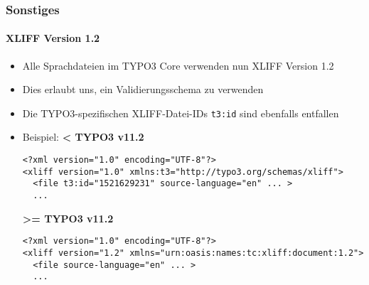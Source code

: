 %

\begin{frame}[fragile]
	\frametitle{Sonstiges}
	\framesubtitle{XLIFF Version 1.2}


	\begin{itemize}
		\item Alle Sprachdateien im TYPO3 Core verwenden nun XLIFF Version 1.2
		\item Dies erlaubt uns, ein Validierungsschema zu verwenden
		\item Die TYPO3-spezifischen XLIFF-Datei-IDs \texttt{t3:id} sind ebenfalls entfallen
		\item Beispiel:\newline
\smaller\textbf{< TYPO3 v11.2}\normalsize
\begin{lstlisting}
<?xml version="1.0" encoding="UTF-8"?>
<xliff version="1.0" xmlns:t3="http://typo3.org/schemas/xliff">
  <file t3:id="1521629231" source-language="en" ... >
  ...
\end{lstlisting}
\smaller\textbf{>= TYPO3 v11.2}\normalsize
\begin{lstlisting}
<?xml version="1.0" encoding="UTF-8"?>
<xliff version="1.2" xmlns="urn:oasis:names:tc:xliff:document:1.2">
  <file source-language="en" ... >
  ...
\end{lstlisting}

	\end{itemize}

\end{frame}

